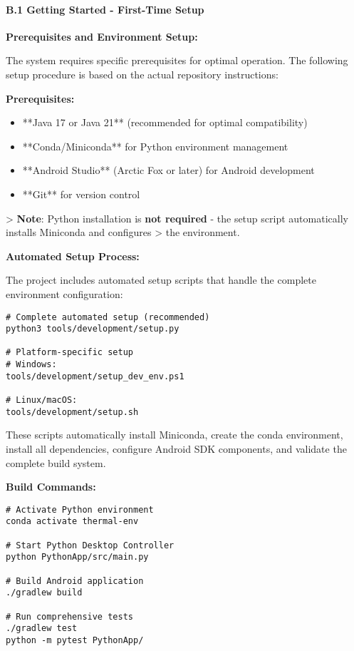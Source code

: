 \documentclass[12pt,a4paper]{article}
\begin{document}
\paragraph{B.1 Getting Started - First-Time Setup}

\textbf{Prerequisites and Environment Setup:}

The system requires specific prerequisites for optimal operation. The following setup procedure is based on the actual
repository instructions:

\textbf{Prerequisites:}

\begin{itemize}
\item **Java 17 or Java 21** (recommended for optimal compatibility)
\item **Conda/Miniconda** for Python environment management
\item **Android Studio** (Arctic Fox or later) for Android development
\item **Git** for version control

\end{itemize}
> \textbf{Note}: Python installation is \textbf{not required} - the setup script automatically installs Miniconda and configures
> the environment.

\textbf{Automated Setup Process:}

The project includes automated setup scripts that handle the complete environment configuration:

\begin{verbatim}
# Complete automated setup (recommended)
python3 tools/development/setup.py

# Platform-specific setup
# Windows:
tools/development/setup_dev_env.ps1

# Linux/macOS:
tools/development/setup.sh
\end{verbatim}

These scripts automatically install Miniconda, create the conda environment, install all dependencies, configure Android
SDK components, and validate the complete build system.

\textbf{Build Commands:}

\begin{verbatim}
# Activate Python environment
conda activate thermal-env

# Start Python Desktop Controller
python PythonApp/src/main.py

# Build Android application
./gradlew build

# Run comprehensive tests
./gradlew test
python -m pytest PythonApp/
\end{verbatim}
\end{document}
